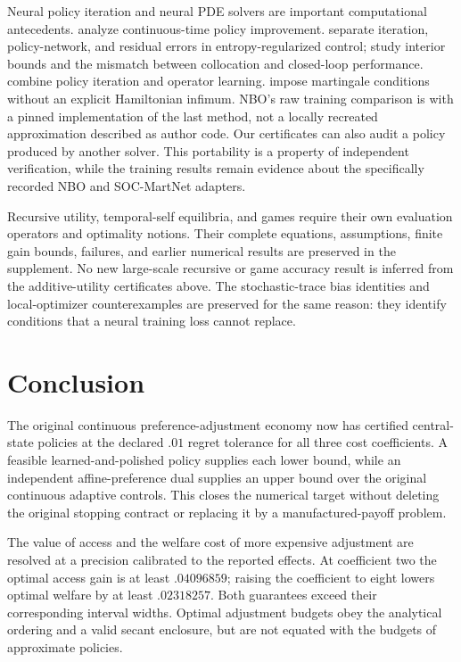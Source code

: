 Neural policy iteration and neural PDE solvers are important computational antecedents. \citet{jacka2015} analyze continuous-time policy improvement. \citet{kim2026explore} separate iteration, policy-network, and residual errors in entropy-regularized control; \citet{kim2026interior} study interior bounds and the mismatch between collocation and closed-loop performance. \citet{lee2025} combine policy iteration and operator learning. \citet{cai2025published} impose martingale conditions without an explicit Hamiltonian infimum. NBO's raw training comparison is with a pinned implementation of the last method, not a locally recreated approximation described as author code. Our certificates can also audit a policy produced by another solver. This portability is a property of independent verification, while the training results remain evidence about the specifically recorded NBO and SOC-MartNet adapters.

Recursive utility, temporal-self equilibria, and games require their own evaluation operators and optimality notions. Their complete equations, assumptions, finite gain bounds, failures, and earlier numerical results are preserved in the supplement. No new large-scale recursive or game accuracy result is inferred from the additive-utility certificates above. The stochastic-trace bias identities and local-optimizer counterexamples are preserved for the same reason: they identify conditions that a neural training loss cannot replace.

\section{Conclusion}
The original continuous preference-adjustment economy now has certified central-state policies at the declared $.01$ regret tolerance for all three cost coefficients. A feasible learned-and-polished policy supplies each lower bound, while an independent affine-preference dual supplies an upper bound over the original continuous adaptive controls. This closes the numerical target without deleting the original stopping contract or replacing it by a manufactured-payoff problem.

The value of access and the welfare cost of more expensive adjustment are resolved at a precision calibrated to the reported effects. At coefficient two the optimal access gain is at least $.04096859$; raising the coefficient to eight lowers optimal welfare by at least $.02318257$. Both guarantees exceed their corresponding interval widths. Optimal adjustment budgets obey the analytical ordering and a valid secant enclosure, but are not equated with the budgets of approximate policies.

